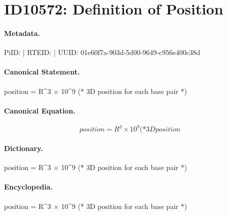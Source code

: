 \section*{ID10572: Definition of Position}
\paragraph{Metadata.}
PiID:  | RTEID:  | UUID: 01e60f7a-903d-5d00-9649-c956e400c38d

\paragraph{Canonical Statement.}
position = R\textasciicircum{}3 × 10\textasciicircum{}9 (* 3D position for each base pair *)

\paragraph{Canonical Equation.}
\[
position = R^3 × 10^9 (* 3D position
\]

\paragraph{Dictionary.}
position = R\textasciicircum{}3 × 10\textasciicircum{}9 (* 3D position for each base pair *)

\paragraph{Encyclopedia.}
position = R\textasciicircum{}3 × 10\textasciicircum{}9 (* 3D position for each base pair *)
